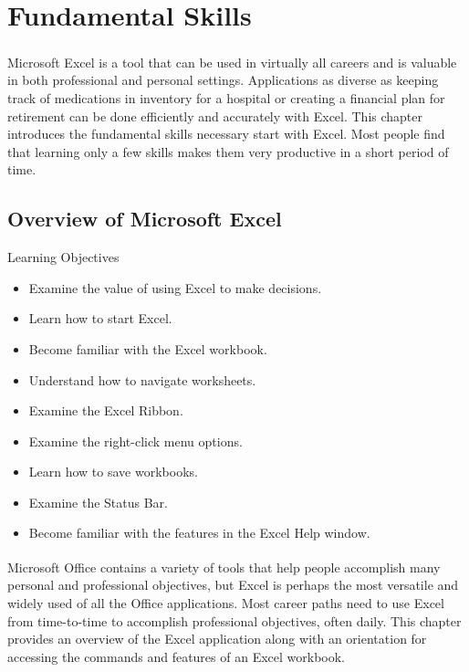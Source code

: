 \chapter{Fundamental Skills}\label{ch01:fundamental_skills}

Microsoft\textsuperscript{\textregistered} Excel\textsuperscript{\textregistered} is a tool that can be used in virtually all careers and is valuable in both professional and personal settings. Applications as diverse as keeping track of medications in inventory for a hospital or creating a financial plan for retirement can be done efficiently and accurately with Excel. This chapter introduces the fundamental skills necessary start with Excel. Most people find that learning only a few skills makes them very productive in a short period of time.

\section{Overview of Microsoft Excel}

\begin{center}
	\begin{objbox}{Learning Objectives}
		\begin{itemize}
			\setlength{\itemsep}{0pt}
			\setlength{\parskip}{0pt}
			\setlength{\parsep}{0pt}
			
			\item Examine the value of using Excel to make decisions.
			\item Learn how to start Excel.
			\item Become familiar with the Excel workbook.
			\item Understand how to navigate worksheets.
			\item Examine the Excel Ribbon.
			\item Examine the right-click menu options.
			\item Learn how to save workbooks.
			\item Examine the Status Bar.
			\item Become familiar with the features in the Excel Help window.
			
		\end{itemize}
	\end{objbox}
\end{center}

Microsoft\textsuperscript{\textregistered} Office\textsuperscript{\textregistered} contains a variety of tools that help people accomplish many personal and professional objectives, but Excel is perhaps the most versatile and widely used of all the Office applications. Most career paths need to use Excel from time-to-time to accomplish professional objectives, often daily. This chapter provides an overview of the Excel application along with an orientation for accessing the commands and features of an Excel workbook.

